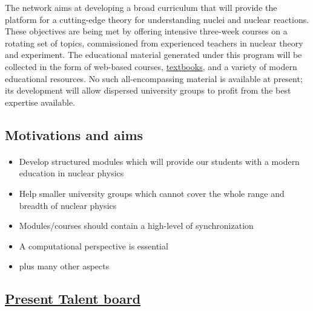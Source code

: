 \documentclass[%
oneside,                 %
final,                   %
10pt]{article}
\begin{document}
The network aims at developing a broad curriculum that will provide the platform for a cutting-edge theory for understanding nuclei and nuclear reactions. These objectives are being met by offering intensive three-week courses on a rotating set of topics, commissioned from experienced teachers in nuclear theory and experiment. The educational material generated under this program will be collected in the form of web-based courses, \href{{http://www.springer.com/gp/book/9783319533353}}{textbooks}, and a variety of modern educational resources. No such all-encompassing material is available at present; its development will allow dispersed university groups to profit from the best expertise available.



\subsection{Motivations and aims}

\paragraph{}
\begin{itemize}
\item Develop structured modules which will provide our students with a modern education in nuclear physics

\item Help smaller university groups which cannot cover the whole range and breadth of nuclear physics

\item Modules/courses should contain a high-level of synchronization

\item A computational perspective is essential

\item plus many other aspects
\end{itemize}

\noindent




\subsection{\href{{http://fribtheoryalliance.org/TALENT/content/board.php}}{Present Talent board}}

\end{document}
